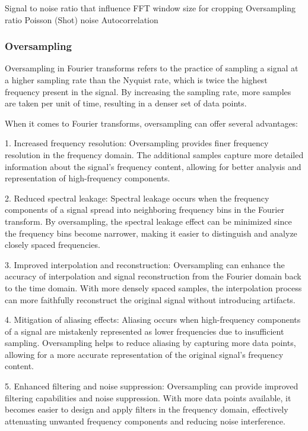 \textcolor{Important}{
    Signal to noise ratio that influence FFT window size for cropping
    Oversampling ratio
    Poisson (Shot) noise
    Autocorrelation
}

\subsubsection{Oversampling}
Oversampling in Fourier transforms refers to the practice of sampling a signal at a higher sampling rate than the Nyquist rate, which is twice the highest frequency present in the signal.
By increasing the sampling rate, more samples are taken per unit of time, resulting in a denser set of data points.

When it comes to Fourier transforms, oversampling can offer several advantages:

1. Increased frequency resolution: Oversampling provides finer frequency resolution in the frequency domain. The additional samples capture more detailed information about the signal's frequency content, allowing for better analysis and representation of high-frequency components.

2. Reduced spectral leakage: Spectral leakage occurs when the frequency components of a signal spread into neighboring frequency bins in the Fourier transform. By oversampling, the spectral leakage effect can be minimized since the frequency bins become narrower, making it easier to distinguish and analyze closely spaced frequencies.

3. Improved interpolation and reconstruction: Oversampling can enhance the accuracy of interpolation and signal reconstruction from the Fourier domain back to the time domain. With more densely spaced samples, the interpolation process can more faithfully reconstruct the original signal without introducing artifacts.

4. Mitigation of aliasing effects: Aliasing occurs when high-frequency components of a signal are mistakenly represented as lower frequencies due to insufficient sampling. Oversampling helps to reduce aliasing by capturing more data points, allowing for a more accurate representation of the original signal's frequency content.

5. Enhanced filtering and noise suppression: Oversampling can provide improved filtering capabilities and noise suppression. With more data points available, it becomes easier to design and apply filters in the frequency domain, effectively attenuating unwanted frequency components and reducing noise interference.

